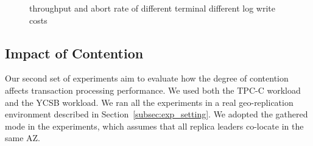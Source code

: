 \documentclass[conference]{IEEEtran}
\begin{document}
\begin{figure}[tbp]
  \centering


\caption{throughput and abort rate of
different terminal different log write costs}
\label{fig:new_order_add_log_cost}
\end{figure}


\subsection{Impact of Contention}

Our second set of experiments aim to evaluate how the degree of contention affects transaction processing performance.
We used both the TPC-C workload and the YCSB workload.
We ran all the experiments in a real geo-replication environment described in Section~\ref{subsec:exp_setting}.
We adopted the gathered mode in the experiments, which assumes that all replica leaders co-locate in the same AZ.
\end{document}

